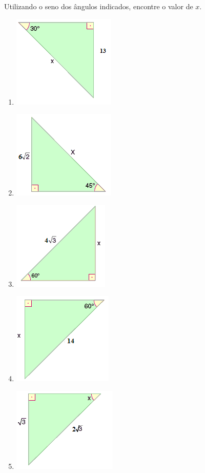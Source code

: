 \item Utilizando o seno dos ângulos indicados, encontre o valor de $x$.
\begin{multicols}{2}
\begin{enumerate}
	\item \includegraphics[scale=0.7]{figuras/fig94.png}
	\item \includegraphics[scale=0.7]{figuras/fig95.png}
	\item \includegraphics[scale=0.7]{figuras/fig96.png}
	\item \includegraphics[scale=0.7]{figuras/fig97.png}
	\item \includegraphics[scale=0.7]{figuras/fig98.png}
\end{enumerate}
\end{multicols}
